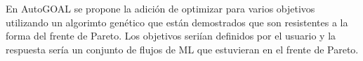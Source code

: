 En AutoGOAL se propone la adici\'on de optimizar para varios objetivos utilizando un algorimto gen\'etico que est\'an demostrados que son resistentes a la forma del frente de Pareto. Los objetivos seri\'ian definidos por el usuario y la respuesta ser\'ia un conjunto de flujos de ML que estuvieran en el frente de Pareto.


